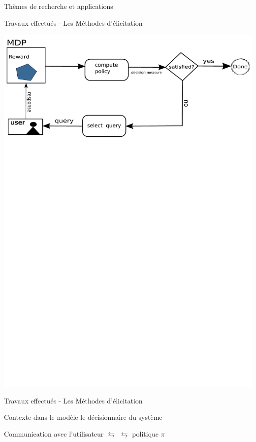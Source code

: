 \documentclass{beamer}
\newcommand{\imp}[1]{\textbf{{\color{blue}{#1}}}}
\begin{document}
{{\begin{frame}{Thèmes de recherche et applications}

\end{frame}
\begin{frame}{Travaux effectués - Les Méthodes d'élicitation}
	\begin{center}
		\includegraphics[scale=0.53]{images/process+}
	\end{center}
\end{frame}

\begin{frame}{Travaux effectués - Les Méthodes d'élicitation}
\begin{block}{Contexte}
\imp{Prédire des informations incertaines} dans le modèle \imp{en interrogeant} le décisionnaire du système
\begin{center}
Communication avec l’utilisateur $\leftrightarrows$  $\leftrightarrows$ politique $\pi$
\end{center}
\end{block}



\end{frame}}}
\end{document}
